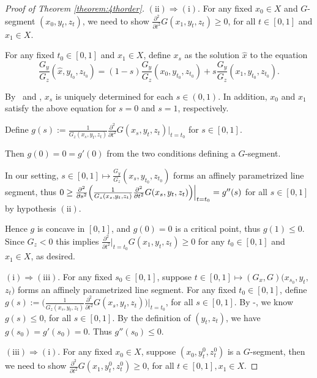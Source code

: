 \begin{proof}[Proof of Theorem \ref{theorem:4thorder}]
	$\mathrm{(ii)}\Rightarrow \mathrm{(i)}.$ For any fixed $x_0 \in X$ and $G$-segment $(x_0, y_t, z_t)$,  we need to show $\frac{\partial^2}{\partial t^2}G(x_1, y_t, z_t) \ge 0$,  for all $t \in [0,1]$ and $x_1 \in X$.
	
	For any fixed $t_0 \in [0,1]$ and $x_1 \in X$, define $x_s$ as the solution $\hat{x}$ to the equation
	\begin{equation}
	\frac{G_y}{G_z}(\hat{x}, y_{t_0},z_{t_0}) = (1-s) \frac{G_y}{G_z}(x_0, y_{t_0},z_{t_0}) +s \frac{G_y}{G_z}(x_1, y_{t_0},z_{t_0}).
	\end{equation}
	
	By \Gseven\ and \Geight, $x_s$ is uniquely determined for each $s\in (0,1)$. In addition, $x_0$ and $x_1$ satisfy the above equation for $s =0$ and $s=1$, respectively.  
	
	Define $g(s):=
	\frac{1}{G_z(x_s,y_t,z_t)}\frac{\partial^2}{\partial t^2}G(x_s, y_t, z_t)
	\Big|_{t=t_0}$ for $s\in [0,1]$.
	
	Then $g(0) =0 = g'(0)$ from the two conditions defining a $G$-segment. 
	
	In our setting,  $s\in [0,1] \longmapsto \frac{G_y}{G_z}(x_s, y_{t_0}, z_{t_0})$ forms an affinely parametrized line segment, thus
	$0\ge \frac{\partial^2}{\partial s^2 }\Bigl(\frac{1}{G_z(x_s, y_t, z_t)}\frac{\partial^2}{\partial t^2} G(x_s,y_t,z_t) \Bigr)\Big|_{t=t_0} = g''(s)$ for all $ s \in [0,1]$ by hypothesis $\mathrm{(ii)}$.
	
	Hence $g$ is concave in $[0,1]$, and $g(0)=0$ is a critical point, thus $g(1)\le 0$. Since $G_z<0$ this implies $\frac{\partial^2}{\partial t^2}\Big|_{t=t_0}G(x_1, y_t, z_t) \ge 0$ for any $t_0 \in [0,1]$ and $x_1 \in X$,
	as desired.
	\medskip
	
	$\mathrm{(i)}\Rightarrow \mathrm{(iii)}.$
	For any fixed $s_0\in [0,1]$, suppose $t\in [0,1] \longmapsto (G_x, G)(x_{s_0}, y_t,$ $ z_t)$  forms an affinely parametrized line segment. For any fixed $t_0 \in [0,1]$, define $g(s):=\Big(\frac{1}{G_z(x_s,y_t,z_t)}\frac{\partial^2}{\partial t^2}G(x_s, y_t, z_t)\Big)\Big|_{t=t_0}$, for all $s \in [0,1]$. By \Gthree-\Gfour, we know $g(s)\le 0$, for all $s\in [0,1]$. By the definition of $(y_t, z_t)$, we have $g(s_0)=g'(s_0) =0$. Thus $g''(s_0)\le 0$.
	\medskip
	
	$\mathrm{(iii)}\Rightarrow \mathrm{(i)}.$ For any fixed $x_0 \in X$, suppose $(x_0, y_t^{0}, z_t^{0})$ is a $G$-segment, then we need to show $\frac{\partial^2}{\partial t^2}G(x_1, y_t^{0}, z_t^{0}) \ge 0$,  for all $t \in [0,1], x_1 \in X$.
	

\end{proof}
